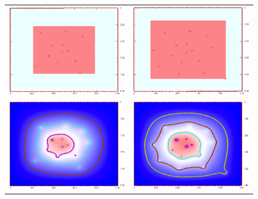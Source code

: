 \begin{refsection}
\begin{figure}
\centering
\begin{tabular}{cc}
\includegraphics[width=0.48\hsize]{green/images/resultate/grfl/step0144.png}
& \includegraphics[width=0.48\hsize]{green/images/resultate/grfl/step0175.png}\vspace{1cm}\\
\includegraphics[width=0.48\hsize]{green/images/resultate/cp/step0144.png}
& \includegraphics[width=0.48\hsize]{green/images/resultate/cp/step0175.png}\vspace{1cm}\\

\end{tabular}
\end{figure}
\end{refsection}
